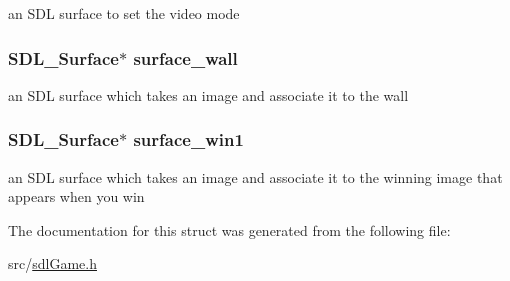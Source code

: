 an S\-D\-L surface to set the video mode \hypertarget{structsdl_game_a78af5dbd8ac60c62da4e1530b2f5d224}{
\subsubsection[{surface\-\_\-wall}]{\setlength{\rightskip}{0pt plus 5cm}S\-D\-L\-\_\-\-Surface$\ast$ surface\-\_\-wall}}\label{structsdl_game_a78af5dbd8ac60c62da4e1530b2f5d224}
an S\-D\-L surface which takes an image and associate it to the wall \hypertarget{structsdl_game_aea8a6e9c86a586df7bf3f2ad82c19b98}{
\subsubsection[{surface\-\_\-win1}]{\setlength{\rightskip}{0pt plus 5cm}S\-D\-L\-\_\-\-Surface$\ast$ surface\-\_\-win1}}\label{structsdl_game_aea8a6e9c86a586df7bf3f2ad82c19b98}
an S\-D\-L surface which takes an image and associate it to the winning image that appears when you win 

The documentation for this struct was generated from the following file\-:\begin{DoxyCompactItemize}
\item 
src/\hyperlink{sdl_game_8h}{sdl\-Game.\-h}\end{DoxyCompactItemize}
